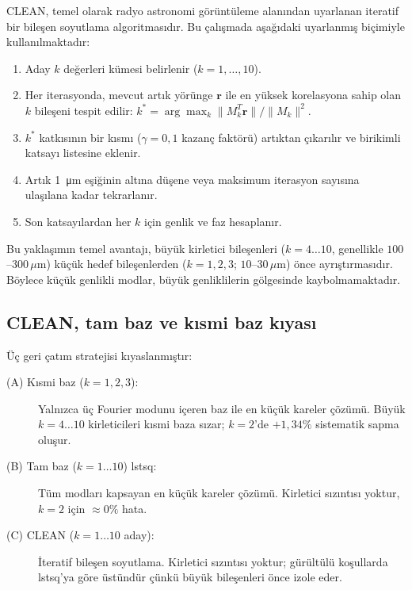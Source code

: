 \documentclass[preprint,12pt]{elsarticle}
\begin{document}
CLEAN, temel olarak radyo astronomi görüntüleme alanından uyarlanan
iteratif bir bileşen soyutlama algoritmasıdır. Bu çalışmada aşağıdaki
uyarlanmış biçimiyle kullanılmaktadır:

\begin{enumerate}
  \item Aday $k$ değerleri kümesi belirlenir ($k=1,\ldots,10$).
  \item Her iterasyonda, mevcut artık yörünge $\mathbf{r}$ ile en yüksek
    korelasyona sahip olan $k$ bileşeni tespit edilir:
    $k^* = \arg\max_k \|M_k^T \mathbf{r}\| / \|M_k\|^2$.
  \item $k^*$ katkısının bir kısmı ($\gamma=0{,}1$ kazanç faktörü) artıktan
    çıkarılır ve birikimli katsayı listesine eklenir.
  \item Artık \SI{1}{\micro\meter} eşiğinin altına düşene veya maksimum
    iterasyon sayısına ulaşılana kadar tekrarlanır.
  \item Son katsayılardan her $k$ için genlik ve faz hesaplanır.
\end{enumerate}

Bu yaklaşımın temel avantajı, büyük kirletici bileşenleri ($k=4\ldots10$,
genellikle $100$--$300\,\mu$m) küçük hedef bileşenlerden ($k=1,2,3$;
$10$--$30\,\mu$m) önce ayrıştırmasıdır. Böylece küçük genlikli modlar,
büyük genliklilerin gölgesinde kaybolmamaktadır.

\subsection{CLEAN, tam baz ve kısmi baz kıyası}

Üç geri çatım stratejisi kıyaslanmıştır:
\begin{description}
  \item[(A) Kısmi baz ($k=1,2,3$):] Yalnızca üç Fourier modunu içeren
    baz ile en küçük kareler çözümü. Büyük $k=4\ldots10$ kirleticileri
    kısmi baza sızar; $k=2$'de $+1{,}34\%$ sistematik sapma oluşur.
  \item[(B) Tam baz ($k=1\ldots10$) lstsq:] Tüm modları kapsayan en küçük
    kareler çözümü. Kirletici sızıntısı yoktur, $k=2$ için $\approx0\%$ hata.
  \item[(C) CLEAN ($k=1\ldots10$ aday):] İteratif bileşen soyutlama.
    Kirletici sızıntısı yoktur; gürültülü koşullarda lstsq'ya göre üstündür
    çünkü büyük bileşenleri önce izole eder.
\end{description}
\end{document}
